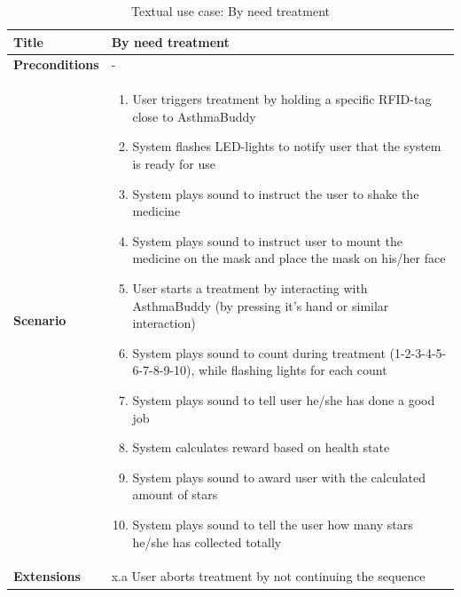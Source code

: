 \begin{table}[H]
\begin{tabular}{|p{4.0cm} | p{9.0cm} |}
\hline
\textbf{Title} & By need treatment \\
\hline
\textbf{Preconditions} & - \\
\hline 
\textbf{Scenario} & 
	\begin{enumerate}
	  \item User triggers treatment by holding a specific RFID-tag close to AsthmaBuddy
	  \item System flashes LED-lights to notify user that the system is ready for use
	  \item System plays sound to instruct the user to shake the medicine
	  \item System plays sound to instruct user to mount the medicine on the mask and place the mask on his/her face
	  \item User starts a treatment by interacting with AsthmaBuddy (by pressing it's hand or similar interaction)
	  \item System plays sound to count during treatment (1-2-3-4-5-6-7-8-9-10), while flashing lights for each count
	  \item System plays sound to tell user he/she has done a good job
	  \item System calculates reward based on health state
	  \item System plays sound to award user with the calculated amount of stars
	  \item System plays sound to tell the user how many stars he/she has collected totally
	\end{enumerate}
\\
\hline
	\textbf{Extensions} & 
		x.a User aborts treatment by not continuing the sequence
\\
\hline
\end{tabular}
\caption{Textual use case: By need treatment}
\label{tab:textual-use-case}
\end{table}


